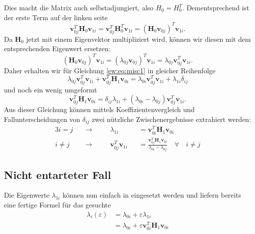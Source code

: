 Dies macht die Matrix auch selbstadjungiert, also $H_0 = H_0^T$. Dementsprechend ist der erste Term auf der linken seite
\begin{equation}
    \bm v_{0j}^T \bm H_0 \bm v_{1i}
    =
    \bm v_{0j}^T \bm H_0^T \bm v_{1i}
    =
    \left( \bm H_0 \bm v_{0j} \right)^T \bm v_{1i}.
\end{equation}
Da $\bm H_0$ jetzt mit einem Eigenvektor multipliziert wird, können wir diesen mit dem entsprechenden Eigenwert ersetzen:
\begin{equation}
    \left( \bm H_0 \bm v_{0j} \right)^T \bm v_{1i}
    =
    \left( \lambda_{0j} \bm v_{0j} \right)^T \bm v_{1i}
    =
    \lambda_{0j} \bm v_{0j}^T \bm v_{1i}.
\end{equation}
Daher erhalten wir für Gleichung \eqref{ew:eq:misc1} in gleicher Reihenfolge
\begin{equation}
    \lambda_{0j} \bm v_{0j}^T \bm v_{1i} +
    \bm v_{0j}^T \bm H_1 \bm v_{0i}
    =
    \lambda_{0i} \bm v_{0j}^T \bm v_{1i} +
    \lambda_{1i} \delta_{ij}
\end{equation}
und noch ein wenig umgeformt
\begin{equation}
    \bm v_{0j}^T \bm H_1 \bm v_{0i}
    =
    \delta_{ij} \lambda_{1i} +
    ( \lambda_{0i} - \lambda_{0j} )
    \bm v_{0j}^T  \bm v_{1i} .
\end{equation} \label{ew:eq:f}
Aus dieser Gleichung können mittels Koeffizientenvergleich und Fallunterscheidungen von $\delta_{ij}$ zwei nützliche Zwischenergebnisse extrahiert werden:
\begin{alignat}{3}
    i = j \quad & \rightarrow  \quad && \lambda_{1i}&& = \bm v_{0i}^T \bm H_1 \bm v_{0i} \\
    i \neq j \quad & \rightarrow \quad && \bm v_{0j}^T \bm v_{1i}&& = \frac{\bm v_{0j}^T \bm H_1 \bm v_{0i}}{\lambda_{0i} - \lambda_{0j}} \quad \forall \quad  i \neq j  \label{ew:eq:f2}
\end{alignat}

\subsection{Nicht entarteter Fall}

Die Eigenwerte $\lambda_{1i}$ können nun einfach in  eingesetzt werden und liefern bereits eine fertige Formel für das gesuchte
\begin{align*}
    \lambda_i(\varepsilon)
    &=
    \lambda_{0i} + \varepsilon \lambda_{1i} \\
    &=
    \lambda_{0i} + \varepsilon \bm v_{0i}^T \bm H_1 \bm v_{0i}
\end{align*}

